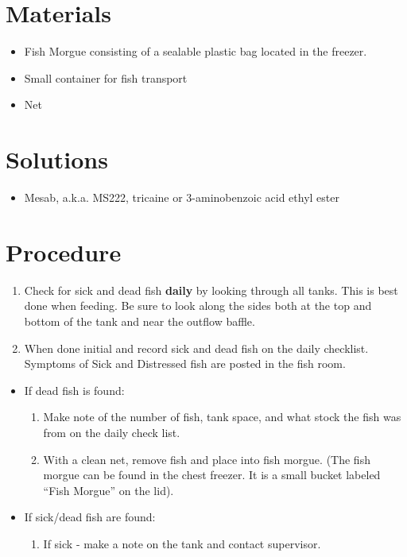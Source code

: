 \documentclass[
  letterpaper,
  DIV=11,
  numbers=noendperiod]{scrreprt}
\providecommand{\tightlist}{%
  \setlength{\itemsep}{0pt}\setlength{\parskip}{0pt}}\usepackage{longtable,booktabs,array}
\begin{document}
\hypertarget{materials-12}{%
\section{Materials}\label{materials-12}}

\begin{itemize}
\tightlist
\item
  Fish Morgue consisting of a sealable plastic bag located in the
  freezer.
\item
  Small container for fish transport
\item
  Net
\end{itemize}

\hypertarget{solutions-10}{%
\section{Solutions}\label{solutions-10}}

\begin{itemize}
\tightlist
\item
  Mesab, a.k.a. MS222, tricaine or 3-aminobenzoic acid ethyl ester
\end{itemize}

\hypertarget{procedure-13}{%
\section{Procedure}\label{procedure-13}}

\begin{enumerate}
\def\labelenumi{\arabic{enumi}.}
\tightlist
\item
  Check for sick and dead fish \textbf{daily} by looking through all
  tanks. This is best done when feeding. Be sure to look along the sides
  both at the top and bottom of the tank and near the outflow baffle.
\item
  When done initial and record sick and dead fish on the daily
  checklist. Symptoms of Sick and Distressed fish are posted in the fish
  room.
\end{enumerate}

\begin{itemize}
\tightlist
\item
  If dead fish is found:

  \begin{enumerate}
  \def\labelenumi{\arabic{enumi}.}
  \tightlist
  \item
    Make note of the number of fish, tank space, and what stock the fish
    was from on the daily check list.
  \item
    With a clean net, remove fish and place into fish morgue. (The fish
    morgue can be found in the chest freezer. It is a small bucket
    labeled ``Fish Morgue'' on the lid).
  \end{enumerate}
\item
  If sick/dead fish are found:

  \begin{enumerate}
  \def\labelenumi{\arabic{enumi}.}
  \tightlist
  \item
    If sick - make a note on the tank and contact supervisor.
  \end{enumerate}
\end{itemize}
\end{document}
